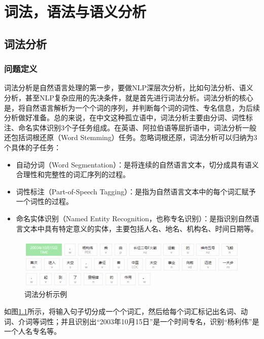 
\chapter{词法，语法与语义分析}
\label{basic} %

\section{词法分析}
\subsection{问题定义}
词法分析是自然语言处理的第一步，要做NLP深层次分析，比如句法分析、语义分析，甚至NLP复杂应用的先决条件，就是首先进行词法分析。词法分析的核心是，将自然语言解析为一个个词的序列，并判断每个词的词性、专名信息，为后续分析做好准备。总的来说，在中文这种孤立语中，词法分析主要由分词、词性标注、命名实体识别3个子任务组成。在英语、阿拉伯语等屈折语中，词法分析一般还包括词根还原（Word Stemming）任务。忽略词根还原，词法分析可以归纳为3个具体的子任务：

\begin{itemize}
\item 自动分词（Word Segmentation）：是将连续的自然语言文本，切分成具有语义合理性和完整性的词汇序列的过程。
\item 词性标注（Part-of-Speech Tagging）：是指为自然语言文本中的每个词汇赋予一个词性的过程。
\item 命名实体识别（Named Entity Recognition，也称专名识别）：是指识别自然语言文本中具有特定意义的实体，主要包括人名、地名、机构名、时间日期等。
\end{itemize}

\begin{figure}[h!]
\centering
\includegraphics[scale=0.5]{img/chapter_nlp/lexical_example.png}
\caption{词法分析示例}
\label{fig:lexical_example}
\end{figure}

如图\ref{fig:lexical_example}所示，将输入句子切分成一个个词汇，然后给每个词汇标记出名词、动词、介词等词性；并且识别出“2003年10月15日”是一个时间专名，识别“杨利伟”是一个人名专名等。

